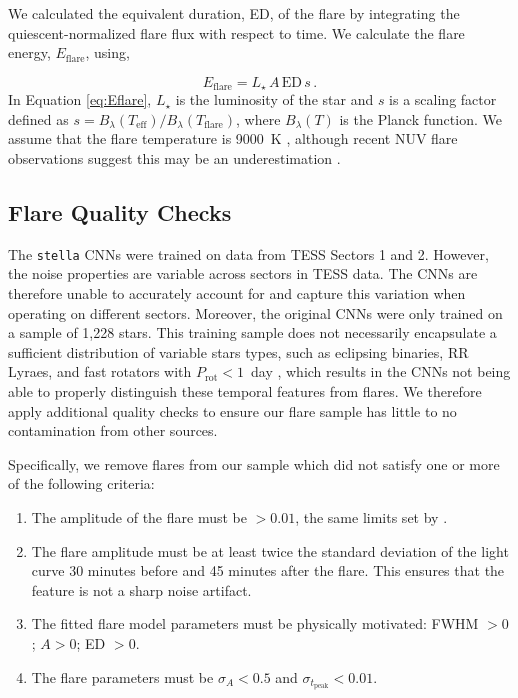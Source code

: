 \documentclass[twocolumn, linenumbers]{aastex631}
\begin{document}
We calculated the equivalent duration, ED, of the flare by integrating the quiescent-normalized flare flux with respect to time. We calculate the flare energy, $E_\textrm{flare}$, using,

\begin{equation}\label{eq:Eflare}
    E_\textrm{flare} = L_\star \, A \, \textrm{ED} \, s \, .
\end{equation}
In Equation \ref{eq:Eflare}, $L_\star$ is the luminosity of the star and $s$ is a scaling factor defined as $s = B_\lambda(T_\textrm{eff}) / B_\lambda(T_\textrm{flare})$, where $B_\lambda(T)$ is
the Planck function. We assume that the flare temperature is 9000~K \citep{hawley92, hawley95}, although recent NUV flare observations suggest this may be an underestimation
\citep{kowalski19, brasseur23, berger23}.

\subsection{Flare Quality Checks}\label{subsec2:qualitychecks}

The \texttt{stella} CNNs were trained on data from TESS Sectors 1 and 2. However, the noise properties are variable across sectors in TESS data. The CNNs are therefore unable to
accurately account for and capture  this variation when operating on different sectors. Moreover, the original CNNs were only trained on a sample of 1,228 stars. This training sample
does not necessarily encapsulate a sufficient distribution  of variable stars types, such as eclipsing binaries, RR Lyraes, and fast
rotators with $P_\textrm{rot} < 1$~day \citep{lawson19}, which
results in the CNNs not being able to properly distinguish these temporal features from flares. We therefore apply additional
quality checks to ensure our flare sample has little to no contamination from other sources.

Specifically, we remove flares from our sample which did not satisfy  one or more of the following criteria:
\begin{enumerate}
    \item  The amplitude of the flare must be $> 0.01$, the same limits set by \cite{feinstein20}.
    \item The flare amplitude  must be at least twice the standard deviation of the light curve 30 minutes before and 45 minutes after the flare. This ensures that the feature is not
    a sharp noise artifact.
    \item  The fitted flare model parameters must be physically motivated: FWHM $> 0$; $A > 0$; ED $> 0$.
    \item The flare parameters must be $\sigma_A < 0.5$ and $\sigma_{t_\textrm{peak}} < 0.01$.
\end{enumerate}
\end{document}

